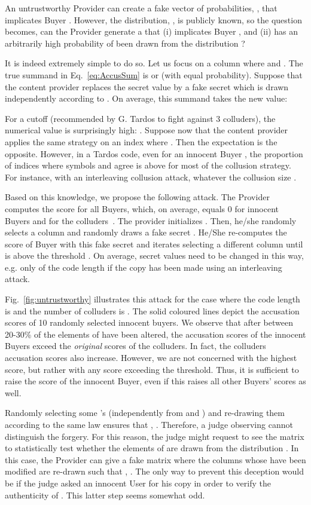 \documentclass{article}
\begin{document}
An untrustworthy Provider can create a fake vector of probabilities,
, that implicates Buyer .  However, the
distribution, , is publicly known, so the question becomes, can
the Provider generate a  that (i) implicates Buyer
, and (ii) has an arbitrarily high probability of been drawn from the
distribution ?


It is indeed extremely simple to do so. Let us focus on a column where
 and . The true summand in
Eq.~\eqref{eq:AccusSum} is  or  (with equal
probability).  Suppose that the content provider replaces the secret
value  by a fake secret  which is drawn independently
according to . On average, this summand takes the new value:

For a cutoff  (recommended by G. Tardos to fight against 3
colluders), the numerical value is surprisingly high:
.  Suppose now that the content provider
applies the same strategy on an index  where . Then the expectation is the opposite. However, in a Tardos code, even for an innocent Buyer , the proportion
 of indices where symbols  and  agree is above
 for most of the collusion strategy.
For instance, with an interleaving collusion attack,  whatever the collusion size .

Based on this knowledge, we propose the following attack. The Provider computes the score for
all Buyers, which, on average, equals 0 for innocent Buyers and
 for the colluders~\cite{SkoricSymmetric}. The provider initializes
. Then, he/she randomly selects a column 
and randomly draws a fake secret . He/She re-computes
the score of Buyer  with this fake secret and iterates selecting a
different column until  is above the threshold .
On average,  secret values  need
to be changed in this way, e.g. only  of the code length if the
copy has been made using an interleaving attack.

Fig.~\ref{fig:untrustworthy} illustrates this attack for the case
where the code length is  and the
number of colluders is .  The
solid coloured lines depict the accusation scores of 10 randomly selected innocent
buyers.  We observe that after between 20-30\% of the elements of 
have been altered, the accusation scores of the innocent
Buyers exceed the {\em original} scores of the colluders.  In fact,
the colluders accusation scores also increase.  However, we are not
concerned with the highest score, but rather with any score
exceeding the threshold.  Thus, it is sufficient to raise the score of the
innocent Buyer, even if this raises all other Buyers' scores as well.

Randomly selecting some 's (independently from 
and ) and re-drawing them according to the same law
ensures that , .  Therefore, a judge
observing  cannot distinguish the forgery.  For this
reason, the judge might request to see the matrix  to statistically test
whether the elements of  are drawn from the distribution
. In this case, the
Provider can give a fake matrix  where the columns
whose  have been modified are re-drawn such that
, . 
The only way to prevent this deception would be if the
judge asked an innocent User  for his copy in order to verify
the authenticity of .  This latter step seems
somewhat odd.
\end{document}

